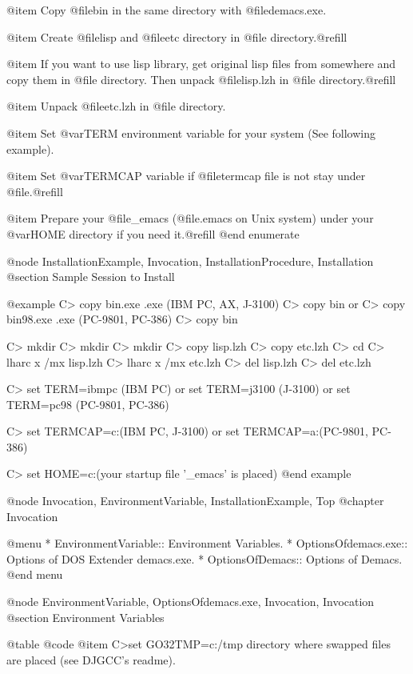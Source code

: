 @item
Copy @file{bin\demacs} in the same directory with @file{demacs.exe}.

@item
Create @file{lisp} and @file{etc} directory in @file{\lib\emacs}
directory.@refill

@item
If you want to use lisp library, get original lisp files from somewhere
and copy them in @file{\lib\emacs\lisp} directory. Then unpack
@file{lisp.lzh} in @file{\lib\emacs} directory.@refill

@item
Unpack @file{etc.lzh} in @file{\lib\emacs} directory.

@item
Set @var{TERM} environment variable for your system (See following example).

@item
Set @var{TERMCAP} variable if @file{termcap} file is not stay under
@file{\etc}.@refill

@item
Prepare your @file{_emacs} (@file{.emacs} on Unix system) under your
@var{HOME} directory if you need it.@refill
@end enumerate


@node InstallationExample, Invocation, InstallationProcedure, Installation
@section Sample Session to Install

@example
C> copy bin\demacspc.exe \tools\bin\demacs.exe (IBM PC, AX, J-3100)
C> copy bin\demacs \tools\bin
     or
C> copy bin\demacs98.exe \tools\bin\demacs.exe (PC-9801, PC-386)
C> copy bin\demacs \tools\bin

C> mkdir \lib\emacs
C> mkdir \lib\emacs\lisp
C> mkdir \lib\emacs\etc
C> copy lisp.lzh \lib\emacs
C> copy etc.lzh \lib\emacs
C> cd \lib\emacs
C> lharc x /mx lisp.lzh
C> lharc x /mx etc.lzh
C> del lisp.lzh
C> del etc.lzh

C> set TERM=ibmpc  (IBM PC)
      or
   set TERM=j3100  (J-3100)
      or
   set TERM=pc98   (PC-9801, PC-386)

C> set TERMCAP=c:\etc\termcap   (IBM PC, J-3100)
     or
   set TERMCAP=a:\etc\termcap   (PC-9801, PC-386)

C> set HOME=c:\home (your startup file '_emacs' is placed)
@end example


@node Invocation, EnvironmentVariable, InstallationExample, Top
@chapter Invocation

@menu
* EnvironmentVariable::  Environment Variables.
* OptionsOfdemacs.exe::  Options of DOS Extender demacs.exe.
* OptionsOfDemacs::      Options of Demacs.
@end menu


@node EnvironmentVariable, OptionsOfdemacs.exe, Invocation, Invocation
@section Environment Variables

@table @code
@item C>set GO32TMP=c:/tmp
directory where swapped files are placed (see DJGCC's readme).

